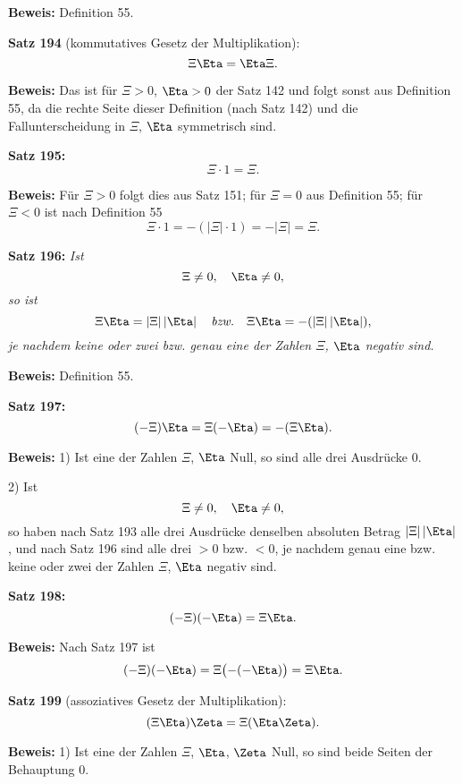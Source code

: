 {\bf Beweis:} Definition 55.
\medskip


{\bf Satz 194} (kommutatives Gesetz der Multiplikation):
{\it $$\Xi\Eta = \Eta\Xi.$$}%

{\bf Beweis:} Das ist f\"ur $\Xi > 0$, $\Eta > 0$ der Satz 142 und folgt
sonst aus Definition 55, da die rechte Seite dieser Definition (nach
Satz 142) und die Fallunterscheidung in $\Xi$, $\Eta$ symmetrisch sind.
\medskip


{\bf Satz 195:} {\it $$\Xi \cdot 1 = \Xi.$$}%

{\bf Beweis:} F\"ur $\Xi > 0$ folgt dies aus Satz 151; f\"ur $\Xi = 0$ aus
Definition 55; f\"ur $\Xi < 0$ ist nach Definition 55
$$\Xi \cdot 1 = -(|\Xi| \cdot 1) = -|\Xi| = \Xi.$$
\medskip


{\bf Satz 196:} {\it Ist
$$\Xi \ne 0,\quad \Eta \ne 0,$$
so ist
$$\Xi\Eta = \left|\Xi\right|\left|\Eta\right| \quad\hbox{\it bzw.}\quad \Xi\Eta = -(\left|\Xi\right|\left|\Eta\right|),$$
je nachdem keine oder zwei bzw. genau eine der Zahlen $\Xi$, $\Eta$ negativ sind.}

{\bf Beweis:} Definition 55.
\medskip


{\bf Satz 197:} {\it $$(-\Xi)\Eta = \Xi(-\Eta) = -(\Xi\Eta).$$}%

{\bf Beweis:} 1) Ist eine der Zahlen $\Xi$, $\Eta$ Null, so sind alle drei
Ausdr\"ucke $0$.

2) Ist
$$\Xi \ne 0,\quad \Eta \ne 0,$$
so haben nach Satz 193 alle drei Ausdr\"ucke denselben absoluten
Betrag $\left|\Xi\right|\left|\Eta\right|$, und nach Satz 196 sind alle drei $> 0$ bzw. $< 0$,
je nachdem genau eine bzw. keine oder zwei der Zahlen $\Xi$, $\Eta$
negativ sind.
\medskip


{\bf Satz 198:} {\it $$(-\Xi)(-\Eta) = \Xi\Eta.$$}%

{\bf Beweis:} Nach Satz 197 ist
$$(-\Xi)(-\Eta) = \Xi\bigl(-(-\Eta)\bigr) = \Xi\Eta.$$
\medskip


{\bf Satz 199} (assoziatives Gesetz der Multiplikation):
{\it $$(\Xi\Eta)\Zeta = \Xi(\Eta\Zeta).$$}%

{\bf Beweis:} 1) Ist eine der Zahlen $\Xi$, $\Eta$, $\Zeta$ Null, so sind beide
Seiten der Behauptung 0.

